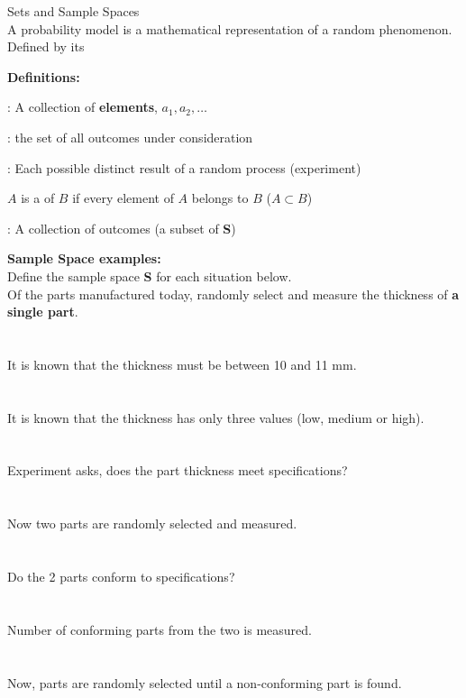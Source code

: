 \huge Sets and Sample Spaces\\ \normalsize
A probability model is a mathematical representation of a random phenomenon. Defined by its
\bi
\item %
\item %
\item %
\ei
\textbf{Definitions:}
\bi
\item \underbar{~~~~~~~~~~~~~~~~~~~~~~~}: A collection of \textbf{elements}, $a_1,a_2,\ldots$\\
\item \underbar{~~~~~~~~~~~~~~~~~~~~~~~~~~~~~~~~~~~~~~~~~~~}: the set of all outcomes under consideration\\
\item \underbar{~~~~~~~~~~~~~~~~~~~~~~~}: Each possible distinct result of a random process (experiment)\\
\item $A$ is a \underbar{~~~~~~~~~~~~~~~~~~~~~~~~~~} of $B$ if every element of $A$ belongs to $B$ ($A \subset B$)\\
\item \underbar{~~~~~~~~~~~~~~~~~~~~~~~}: A collection of outcomes (a subset of \textbf{S})\\
\ei

\textbf{Sample Space examples:}\\
Define the sample space \textbf{S} for each situation below.\\
Of the parts manufactured today, randomly select and measure the thickness of \textbf{a single part}.  \\~\\~\\
It is known that the thickness must be between 10 and 11 mm.   \\~\\~\\
It is known that the thickness has only three values (low, medium or high). \\~\\~\\
Experiment asks, does the part thickness meet specifications?\\~\\~\\
Now two parts are randomly selected and measured.\\~\\~\\
Do the 2 parts conform to specifications? \\~\\~\\
Number of conforming parts from the two is measured.\\~\\~\\
Now, parts are randomly selected until a non-conforming part is found.\\~\\~\\~\\~\\

